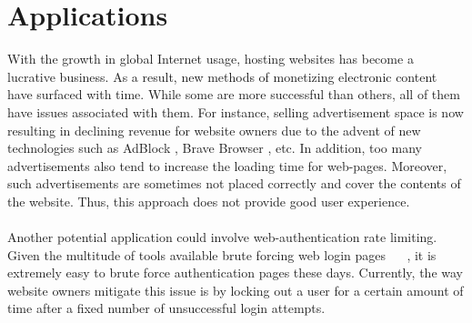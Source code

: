 \documentclass[runningheads]{llncs}
\begin{document}
\section{Applications}
\label{sec:applications}
With the growth in global Internet usage, hosting websites has become a lucrative business. As a result, new methods of monetizing electronic content have surfaced with time. While some are more successful than others, all of them have issues associated with them. For instance, selling advertisement space is now resulting in declining revenue \cite{decliningRevenue} for website owners due to the advent of new technologies such as AdBlock \cite{Adblock}, Brave Browser \cite{BraveBrowser}, etc. In addition, too many advertisements also tend to increase the loading time for web-pages. Moreover, such advertisements are sometimes not placed correctly and cover the contents of the website. Thus, this approach does not provide good user experience. \\ \\
Another potential application could involve web-authentication rate limiting. Given the multitude of tools available brute forcing web login pages ~\cite{hydra} ~\cite{burpsuite}, it is extremely easy to brute force authentication pages these days. Currently, the way website owners mitigate this issue is by locking out a user for a certain amount of time after a fixed number of unsuccessful login attempts. 
\end{document}
